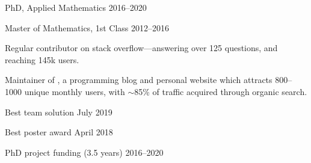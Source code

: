 \documentclass[12pt, a4paper]{article}
\begin{document}

%
        {PhD, Applied Mathematics}%
        {2016--2020}

%
        {Master of Mathematics, 1st Class}%
        {2012--2016}




       {Regular contributor on stack overflow---answering over 125 questions,
       and reaching 145k users.}%

       {Maintainer of \href{https://\website}{\website}, a programming blog and
       personal website which attracts 800--1000 unique monthly users, with
       $\sim$85\% of traffic acquired through organic search.}





%
          {Best team solution}%
          {July 2019}

%
          {Best poster award}%
          {April 2018}

%
          {PhD project funding (3.5 years)}%
          {2016--2020}
\end{document}
